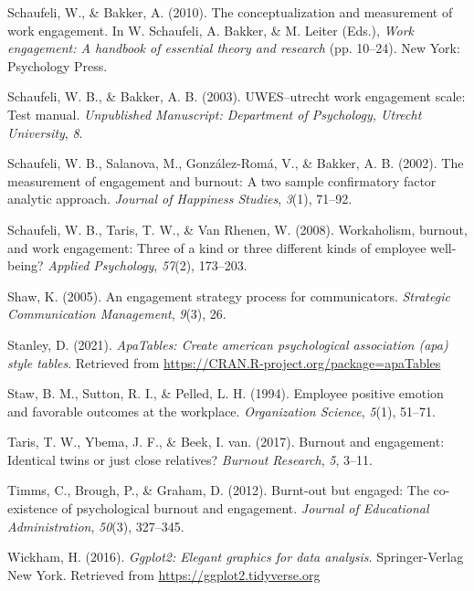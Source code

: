 \documentclass[
  english,
  man]{apa6}
\begin{document}
\leavevmode\hypertarget{ref-schaufeli_conceptualization_2010}{}%
Schaufeli, W., \& Bakker, A. (2010). The conceptualization and measurement of work engagement. In W. Schaufeli, A. Bakker, \& M. Leiter (Eds.), \emph{Work engagement: A handbook of essential theory and research} (pp. 10--24). New York: Psychology Press.

\leavevmode\hypertarget{ref-schaufeli_uwesutrecht_2003}{}%
Schaufeli, W. B., \& Bakker, A. B. (2003). UWES--utrecht work engagement scale: Test manual. \emph{Unpublished Manuscript: Department of Psychology, Utrecht University}, \emph{8}.

\leavevmode\hypertarget{ref-schaufeli_measurement_2002}{}%
Schaufeli, W. B., Salanova, M., González-Romá, V., \& Bakker, A. B. (2002). The measurement of engagement and burnout: A two sample confirmatory factor analytic approach. \emph{Journal of Happiness Studies}, \emph{3}(1), 71--92.

\leavevmode\hypertarget{ref-schaufeli2008workaholism}{}%
Schaufeli, W. B., Taris, T. W., \& Van Rhenen, W. (2008). Workaholism, burnout, and work engagement: Three of a kind or three different kinds of employee well-being? \emph{Applied Psychology}, \emph{57}(2), 173--203.

\leavevmode\hypertarget{ref-shaw2005engagement}{}%
Shaw, K. (2005). An engagement strategy process for communicators. \emph{Strategic Communication Management}, \emph{9}(3), 26.

\leavevmode\hypertarget{ref-R-apaTables}{}%
Stanley, D. (2021). \emph{ApaTables: Create american psychological association (apa) style tables}. Retrieved from \url{https://CRAN.R-project.org/package=apaTables}

\leavevmode\hypertarget{ref-staw_employee_1994}{}%
Staw, B. M., Sutton, R. I., \& Pelled, L. H. (1994). Employee positive emotion and favorable outcomes at the workplace. \emph{Organization Science}, \emph{5}(1), 51--71.

\leavevmode\hypertarget{ref-taris2017burnout}{}%
Taris, T. W., Ybema, J. F., \& Beek, I. van. (2017). Burnout and engagement: Identical twins or just close relatives? \emph{Burnout Research}, \emph{5}, 3--11.

\leavevmode\hypertarget{ref-timms2012burnt}{}%
Timms, C., Brough, P., \& Graham, D. (2012). Burnt-out but engaged: The co-existence of psychological burnout and engagement. \emph{Journal of Educational Administration}, \emph{50}(3), 327--345.

\leavevmode\hypertarget{ref-R-ggplot2}{}%
Wickham, H. (2016). \emph{Ggplot2: Elegant graphics for data analysis}. Springer-Verlag New York. Retrieved from \url{https://ggplot2.tidyverse.org}
\end{document}
